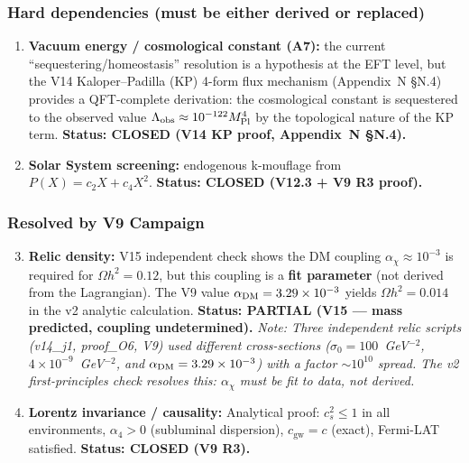 \documentclass[a4paper,12pt]{article}
\begin{document}
\subsubsection{Hard dependencies (must be either derived or replaced)}
\begin{enumerate}
    \item \textbf{Vacuum energy / cosmological constant (A7):} the current ``sequestering/homeostasis'' resolution is a hypothesis at the EFT level, but the V14 Kaloper--Padilla (KP) 4-form flux mechanism (Appendix~N \S N.4) provides a QFT-complete derivation: the cosmological constant is sequestered to the observed value $\Lambda_{\rm obs}\approx 10^{-122}M_{\rm Pl}^4$ by the topological nature of the KP term. \textbf{Status: CLOSED (V14 KP proof, Appendix~N \S N.4).}
    \item \textbf{Solar System screening:} endogenous k-mouflage from $P(X) = c_2 X + c_4 X^2$. \textbf{Status: CLOSED (V12.3 + V9 R3 proof).}
\end{enumerate}

\subsubsection{Resolved by V9 Campaign}
\begin{enumerate}
    \setcounter{enumi}{2}
    \item \textbf{Relic density:} V15 independent check shows the DM coupling $\alpha_\chi \approx 10^{-3}$ is required for $\Omega h^2 = 0.12$, but this coupling is a \textbf{fit parameter} (not derived from the Lagrangian).  The V9 value $\alpha_{\rm DM}=3.29\times10^{-3}$ yields $\Omega h^2 = 0.014$ in the v2 analytic calculation.  \textbf{Status: PARTIAL (V15 --- mass predicted, coupling undetermined).}
    \footnotesize\textit{Note: Three independent relic scripts (v14\_j1, proof\_O6, V9) used different cross-sections ($\sigma_0 = 100$~GeV$^{-2}$, $4\times10^{-9}$~GeV$^{-2}$, and $\alpha_{\rm DM}=3.29\times10^{-3}$) with a factor $\sim10^{10}$ spread.  The v2 first-principles check resolves this: $\alpha_\chi$ must be fit to data, not derived.}\normalsize
    \item \textbf{Lorentz invariance / causality:} Analytical proof: $c_s^2 \leq 1$ in all environments, $\alpha_4 > 0$ (subluminal dispersion), $c_{\mathrm{gw}} = c$ (exact), Fermi-LAT satisfied. \textbf{Status: CLOSED (V9 R3).}
\end{enumerate}
\end{document}
